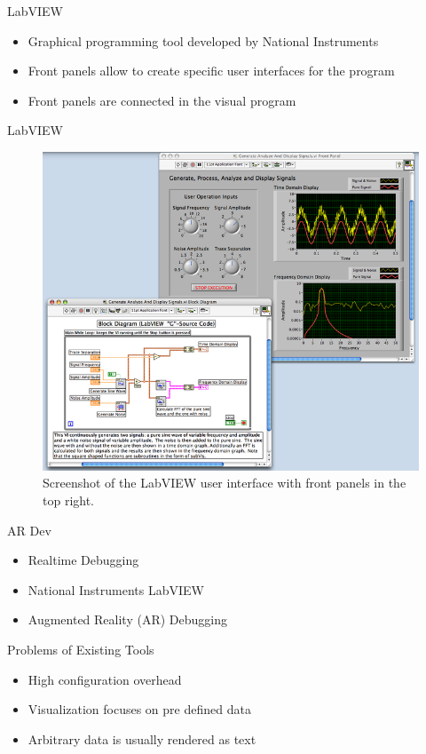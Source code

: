 \documentclass[compress]{beamer}
\begin{document}
\begin{frame}{LabVIEW}
\begin{itemize}
\item Graphical programming tool developed by National Instruments
\item Front panels allow to create specific user interfaces for the program
\item Front panels are connected in the visual program
\end{itemize}
\end{frame}

\begin{frame}{LabVIEW}
\begin{figure}[htbp]
  \centering
  \includegraphics[width=.6\textwidth]{images/labview_frontpanel.png}
  \caption{Screenshot of the LabVIEW user interface with front panels in the top right.}
\end{figure}
\end{frame}

\begin{frame}{AR Dev}
\begin{itemize}
\item Realtime Debugging \cite{Gumbley2009}
\item National Instruments LabVIEW
\item Augmented Reality (AR) Debugging \cite{Collett2010}
\end{itemize}
\end{frame}

\begin{frame}{Problems of Existing Tools}
\begin{itemize}
\item High configuration overhead
\item Visualization focuses on pre defined data
\item Arbitrary data is usually rendered as text
\end{itemize}
\end{frame}
\end{document}
